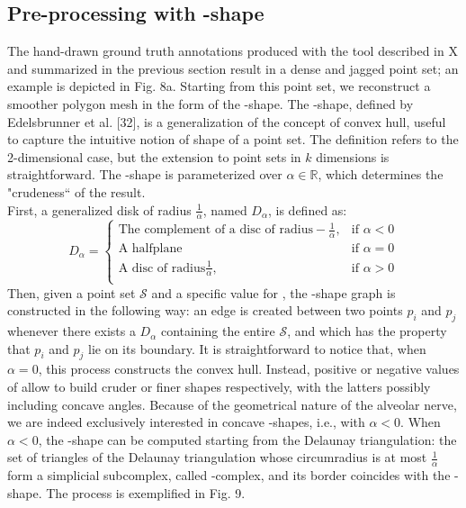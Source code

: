 \subsection{Pre-processing with \textalpha-shape}
The hand-drawn ground truth annotations produced with the
tool described in X and summarized in the previous section
result in a dense and jagged point set; an example is depicted
in Fig. 8a. Starting from this point set, we reconstruct a
smoother polygon mesh in the form of the \textalpha-shape.
The \textalpha-shape, defined by Edelsbrunner et al. [32], is a generalization of the concept of convex hull, useful to capture the
intuitive notion of shape of a point set. The definition refers
to the 2-dimensional case, but the extension to point sets in $k$ dimensions is straightforward. The \textalpha-shape is parameterized
over $\alpha \in \mathbb{R}$, which determines the "crudeness`` of the
result.\\
First, a generalized disk of radius $\frac{1}{\alpha}$, named $D_\alpha$, is defined as:
$$
D_\alpha=
\begin{cases}
  \text{The complement of a disc of radius} -\frac{1}{\alpha}, & \text{if $\alpha<0$}\\
  \text{A halfplane} & \text{if $\alpha=0$}\\
  \text{A disc of radius} \frac{1}{\alpha}, & \text{if $\alpha>0$}\\
\end{cases}
$$
Then, given a point set $\mathcal{S}$ and a specific value for \textalpha, the
\textalpha-shape graph is constructed in the following way: an edge is
created between two points $p_i$ and $p_j$ whenever there exists
a $D_\alpha$ containing the entire $\mathcal{S}$, and which has the property
that $p_i$ and $p_j$ lie on its boundary. It is straightforward to
notice that, when $\alpha = 0$, this process constructs the convex
hull. Instead, positive or negative values of \textalpha\;allow to build
cruder or finer shapes respectively, with the latters possibly including concave
angles. Because of the geometrical nature of the alveolar nerve, we are indeed
exclusively interested in concave \textalpha-shapes, i.e., with $\alpha < 0$.
When $\alpha < 0$, the \textalpha-shape can be computed starting from the
Delaunay triangulation: the set of triangles of the Delaunay triangulation whose
circumradius is at most $\frac{1}{\alpha}$ form a simplicial subcomplex, called
\textalpha-complex, and its border coincides with the \textalpha-shape. The
process is exemplified in Fig. 9.\\
